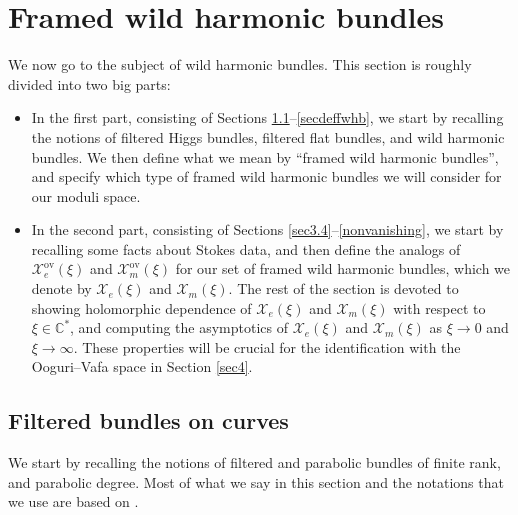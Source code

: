 \documentclass[11pt]{article}
\numberwithin{equation}{section}
\numberwithin{equation}{section}
\begin{document}
\section{Framed wild harmonic bundles}\label{sec3}

We now go to the subject of wild harmonic bundles. This section is roughly divided into two big parts:
\begin{itemize}\itemsep=0pt
 \item In the first part, consisting of Sections \ref{filtbunsec}--\ref{secdeffwhb}, we start by recalling the notions of filtered Higgs bundles, filtered flat bundles, and wild harmonic bundles. We then define what we mean by ``framed wild harmonic bundles'', and specify which type of framed wild harmonic bundles we will consider for our moduli space.
 \item In the second part, consisting of Sections \ref{sec3.4}--\ref{nonvanishing}, we start by recalling some facts about Stokes data, and then define the analogs of $\mathcal{X}_e^{\text{ov}}(\xi)$ and $\mathcal{X}_m^{\text{ov}}(\xi)$ for our set of framed wild harmonic bundles, which we denote by $\mathcal{X}_e(\xi)$ and $\mathcal{X}_m(\xi)$. The rest of the section is devoted to showing holomorphic dependence of $\mathcal{X}_e(\xi)$ and $\mathcal{X}_m(\xi)$ with respect to $\xi\in \mathbb{C}^{*}$, and computing the asymptotics of $\mathcal{X}_e(\xi)$ and $\mathcal{X}_m(\xi)$ as $\xi\to 0$ and $\xi\to \infty$. These properties will be crucial for the identification with the Ooguri--Vafa space in Section \ref{sec4}.
\end{itemize}

\subsection{Filtered bundles on curves}\label{filtbunsec}

We start by recalling the notions of filtered \cite{Sim2,Sim} and parabolic bundles \cite{ParBun,ParBun2} of finite rank, and parabolic degree. Most of what we say in this section and the notations that we use are based on \cite{M,M2,M5}.
\end{document}
